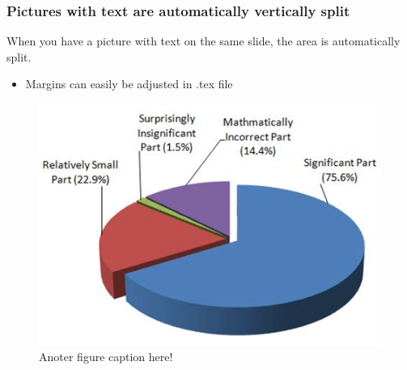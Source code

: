 \documentclass{beamer}
\begin{document}
\begin{frame}
    \frametitle{Pictures with text are automatically vertically split}

	\begin{minipage}{0.4\textwidth}
When you have a picture with text on the same slide, the area is automatically split.	\begin{itemize}
		\item Margins can easily be adjusted in .tex file
	\end{itemize}

	\end{minipage}%
	\hfill
	\begin{minipage}{0.55\textwidth}

    \begin{figure}
        \centering
        \includegraphics[width=\textwidth]{./figs/pie_chart.jpg}
        \caption{Anoter figure caption here!}
    \end{figure}	\end{minipage}

\end{frame}
\end{document}
